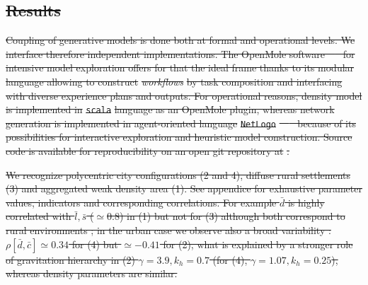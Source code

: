 \documentclass{bmcart}
\providecommand{\DIFdeltex}[1]{{\protect\color{red}\sout{#1}}}                      %
\providecommand{\DIFdelFL}[1]{\DIFdel{#1}} %
\providecommand{\DIFdel}[1]{\texorpdfstring{\DIFdeltex{#1}}{}} %
\begin{document}
\subsection*{\DIFdel{Results}}

\DIFdel{Coupling of generative models is done both at formal and operational levels. We interface therefore independent implementations. The OpenMole software~\mbox{%
\cite{reuillon2013openmole} }%
for intensive model exploration offers for that the ideal frame thanks to its modular language allowing to construct }\emph{\DIFdel{workflows}} %
\DIFdel{by task composition and interfacing with diverse experience plans and outputs. For operational reasons, density model is implemented in }\texttt{\DIFdel{scala}} %
\DIFdel{language as an OpenMole plugin, whereas network generation is implemented in agent-oriented language }\texttt{\DIFdel{NetLogo}}%
\DIFdel{~\mbox{%
\cite{wilensky1999netlogo} }%
because of its possibilities for interactive exploration and heuristic model construction.
Source code is available for reproducibility on an open git repository at }%
\DIFdel{.
}%

{%
\DIFdelFL{We recognize polycentric city configurations (2 and 4), diffuse rural settlements (3) and aggregated weak density area (1). See appendice for exhaustive parameter values, indicators and corresponding correlations. For example $\bar{d}$ is highly correlated with $\bar{l},\bar{s}$ ($\simeq$0.8) in (1) but not for (3) although both correspond to rural environments ; in the urban case we observe also a broad variability : $\rho[\bar{d},\bar{c}]\simeq 0.34$ for (4) but $\simeq-0.41$ for (2), what is explained by a stronger role of gravitation hierarchy in (2) $\gamma=3.9,k_h=0.7$ (for (4), $\gamma=1.07,k_h=0.25$), whereas density parameters are similar.}%
}
\end{document}
